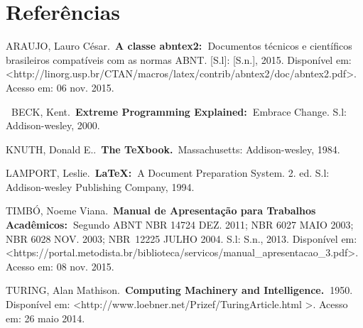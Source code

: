 \chapter*{Refer\^encias}
{\raggedright

{
ARAUJO, Lauro C\'esar.~\textbf{A classe abntex2:~}Documentos t\'ecnicos e cient\'ificos brasileiros compat\'iveis com as
normas ABNT. [S.l]: [S.n.], 2015. Dispon\'ivel em:
{\textless}http://linorg.usp.br/CTAN/macros/latex/contrib/abntex2/doc/abntex2.pdf{\textgreater}.\ \foreignlanguage{english}{Acesso
em: 06 nov. 2015.}}


\bigskip

{
\foreignlanguage{english}{\textbf{~}}\foreignlanguage{english}{BECK, Kent.~}\foreignlanguage{english}{\textbf{Extreme
Programming Explained:~}}\foreignlanguage{english}{Embrace Change. S.l: Addison-wesley, 2000.}}


\bigskip

{
\foreignlanguage{english}{KNUTH, Donald E..~}\foreignlanguage{english}{\textbf{The
TeXbook.}}\foreignlanguage{english}{~Massachusetts: Addison-wesley, 1984.}}


\bigskip

{
\foreignlanguage{english}{LAMPORT, Leslie.~}\foreignlanguage{english}{\textbf{{\LaTeX}:~}}\foreignlanguage{english}{A
Document Preparation System. 2. ed. S.l: Addison-wesley Publishing Company, 1994.}}


\bigskip

{
TIMB\'O, Noeme Viana.~\textbf{Manual de Apresenta\c{c}\~ao para Trabalhos Acad\^emicos:~}Segundo ABNT NBR 14724 DEZ.
2011; NBR 6027 MAIO 2003; NBR 6028 NOV. 2003; NBR\ 12225 JULHO 2004. S.l: S.n., 2013. Dispon\'ivel em:
{\textless}https://portal.metodista.br/biblioteca/servicos/manual\_apresentacao\_3.pdf{\textgreater}.\ \foreignlanguage{english}{Acesso
em: 08 nov. 2015.}}


\bigskip

{
\foreignlanguage{english}{TURING, Alan Mathison.~}\foreignlanguage{english}{\textbf{Computing Machinery and
Intelligence.~}}1950. Dispon\'ivel em: {\textless}http://www.loebner.net/Prizef/TuringArticle.html {\textgreater}.
Acesso em: 26 maio 2014.}


\bigskip


\bigskip

}